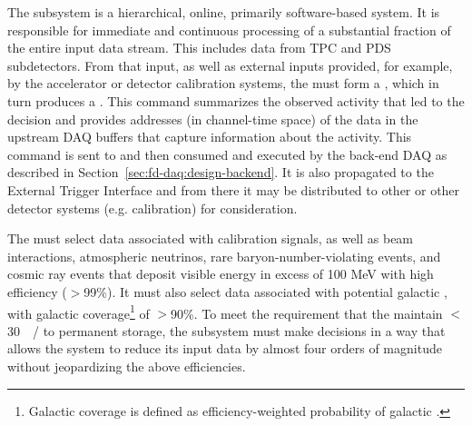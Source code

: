 The  subsystem is a hierarchical, online, primarily
software-based system. It is responsible for immediate and continuous processing of a substantial fraction of the entire input data stream. 
This includes data from TPC and PDS subdetectors.
From that input, as well as external inputs provided, for example, by
the accelerator or detector calibration systems, the  must form a ,
which in turn produces a .
This command summarizes the observed activity that led to the decision
and provides addresses (in channel-time space) of the data in the
upstream DAQ buffers that capture information about the activity.
This command is sent to and then consumed and executed by the back-end
DAQ as described in Section~\ref{sec:fd-daq:design-backend}. 
It is also propagated to the External Trigger Interface and from there it may be
distributed to other  or other detector systems
(e.g. calibration) for consideration.

The  must select data associated with calibration
signals, as well as beam interactions,
atmospheric neutrinos, rare baryon-number-violating events, and cosmic
ray events that deposit visible energy in excess of 100 MeV with high efficiency ($>$99\%). 
It must also select data associated with potential galactic , with galactic coverage\footnote{Galactic coverage is defined as efficiency-weighted probability of galactic .} of $>$90\%.
To meet the requirement that the   maintain
$<$\SI{30}{\peta\byte/\year} to permanent storage, the 
subsystem must make  decisions in a way that allows the  
system to reduce its input data by almost four orders of magnitude
without jeopardizing the above efficiencies.

